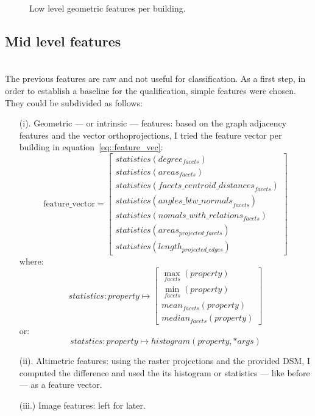 \documentclass[../main.tex]{subfiles}
\begin{document}
	\begin{figure}[H]
		
		\caption{\label{fig::geom_features} Low level geometric features per building.}
	\end{figure}
	\clearpage

	\subsection{Mid level features}
~\\

	The previous features are raw and not useful for classification. As a first
	step, in order to establish a baseline for the qualification, simple
	features were chosen. They could be subdivided as follows:
	\begin{itemize}
		\item[(i).] Geometric --- or intrinsic --- features: based on the graph adjacency features and the vector orthoprojections, I tried the feature vector per building in equation~\ref{eq::feature_vec}:
		\begin{equation}\label{eq::feature_vec}
			\text{feature\_vector} = \begin{bmatrix}
				statistics(degree_{facets})\\
				statistics(areas_{facets})\\
				statistics({facets\_centroid\_distances}_{facets})\\
				statistics({angles\_btw\_normals}_{facets})\\
				statistics(nomals\_with\_relations_{facets})\\
				statistics(areas_{projected\_facets})\\
				statistics(length_{projected\_edges})
		\end{bmatrix}
		\end{equation}
		where:
		\begin{equation}
			statistics: property \mapsto \begin{bmatrix}
			\max_{facets}(property)\\
			\min_{facets}(property)\\
			mean_{facets}(property)\\
			median_{facets}(property)
		\end{bmatrix}
		\end{equation}
		or:
		\begin{equation}
			statstics: property \mapsto histogram(property, *args)
		\end{equation}
		\item[(ii).] Altimetric features: using the raster projections and the provided DSM, I computed the difference and used the its histogram or statistics --- like before --- as a feature vector.
		\item[(iii.)] Image features: left for later.
	\end{itemize}
\end{document}
